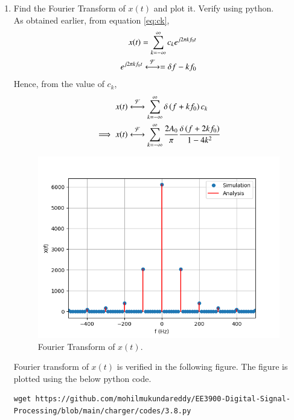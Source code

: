 \documentclass[journal,12pt,twocolumn]{IEEEtran}
\renewcommand\thesection{\arabic{section}}
\begin{document}
\begin{enumerate}[label=\thesection.\arabic*
	,ref=\thesection.\theenumi]
	\item Find the Fourier Transform of $x(t)$ and plot it. Verify using python.\\
	\solution As obtained earlier, from equation \eqref{eq:ck},
	\begin{align}
		x(t)=\sum_{k=-\infty}^{\infty}c_k e^{j2\pi k f_0 t}\\
		e^{j 2 \pi k f_0 t}\overset{\mathcal{F}}{ \longleftrightarrow}=\delta{f-kf_0}
	\end{align}
	Hence, from the value of $c_k$,
	\begin{align}
 x(t)&\overset{\mathcal{F}}{ \longleftrightarrow}\sum_{k=-\infty}^{\infty} \delta\left(f+kf_0\right) c_k\\
		\implies x(t)&\overset{\mathcal{F}}{ \longleftrightarrow}\sum_{k=-\infty}^{\infty} \frac{2A_0}{\pi} \frac{\delta\left(f+2kf_0\right)}{1-4k^2} 
	\end{align} 
	\begin{figure}[!ht]
				\includegraphics[width=\columnwidth]{figs/3.8.png}
				\caption{Fourier Transform of $x(t)$.}
				\label{fig:fourier-xt}
			\end{figure}
	Fourier transform of $x(t)$ is verified in the following figure. 
	The figure is plotted using the below python code.
	\begin{lstlisting}
wget https://github.com/mohilmukundareddy/EE3900-Digital-Signal-Processing/blob/main/charger/codes/3.8.py

\end{lstlisting}
\end{enumerate}
\end{document}
